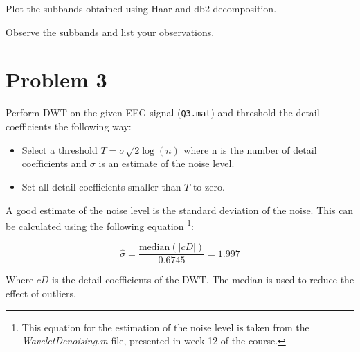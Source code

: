 
\begin{tcolorbox}[colback=green!5!white,colframe=green!75!black,title=Problem 2.c]
    Plot the subbands obtained using Haar and db2 decomposition.
\end{tcolorbox}



\begin{tcolorbox}[colback=green!5!white,colframe=green!75!black,title=Problem 2.d]
    Observe the subbands and list your observations.
\end{tcolorbox}




\section*{Problem 3} \label{sec:problem3}

\begin{tcolorbox}[colback=blue!5!white,boxrule=0pt,frame empty]
    Perform DWT on the given EEG signal (\verb|Q3.mat|) and threshold the detail coefficients
    the following way:
    \vspace{0.5em}
    \begin{itemize}
        \item Select a threshold $T = \sigma \sqrt{2 \log(n)}$ where n is the number of detail coefficients 
        and $\sigma$ is an estimate of the noise level.
        \item Set all detail coefficients smaller than $T$ to zero.
    \end{itemize}
\end{tcolorbox}


\vspace{0.5cm}

A good estimate of the noise level is the standard deviation of the noise. This can be calculated using the following equation
\footnote{This equation for the estimation of the noise level is taken from the \textit{WaveletDenoising.m} file, presented in week 12 of the course.}:

\begin{equation}
    \hat{\sigma} = \frac{\mathrm{median}(|cD|)}{0.6745} = 1.997
\end{equation}

Where $cD$ is the detail coefficients of the DWT. The median is used to reduce the effect of outliers.

